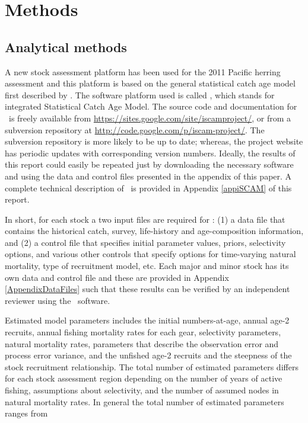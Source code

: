 \section{Methods}


	\subsection{Analytical methods}
	A new stock assessment platform has been used for the 2011 Pacific herring assessment and this platform is based on the general statistical catch age model first described by \cite{fournier1982general}.  The software platform used is called \iscam, which stands for integrated Statistical Catch Age Model.  The source code and documentation for \iscam\ is freely available from \url{https://sites.google.com/site/iscamproject/}, or from a subversion repository at \url{http://code.google.com/p/iscam-project/}.  The subversion repository is more likely to be up to date; whereas, the project website has periodic updates with corresponding version numbers.  Ideally, the results of this report could easily be repeated just by downloading the necessary software and using the data and control files presented in the appendix of this paper. A complete technical description of \iscam\ is provided in Appendix \ref{appiSCAM} of this report.
	
	In short, for each stock a two input files are required for \iscam: (1) a data file that contains the historical catch, survey, life-history and age-composition information, and (2) a control file that specifies initial parameter values, priors, selectivity options, and various other controls that specify options for time-varying natural mortality, type of recruitment model, etc.  Each major and minor stock has its own data and control file and these are provided in Appendix \ref{AppendixDataFiles} such that these results can be verified by an independent reviewer using the \iscam\ software.
	
	Estimated model parameters includes the initial numbers-at-age, annual age-2 recruits, annual fishing mortality rates for each gear, selectivity parameters, natural mortality rates, parameters that describe the observation error and process error variance, and the unfished age-2 recruits and the steepness of the stock recruitment relationship.  The total number of estimated parameters differs for each stock assessment region depending on the number of years of active fishing, assumptions about selectivity, and the number of assumed nodes in natural mortality rates.  In general the total number of estimated parameters ranges from  

